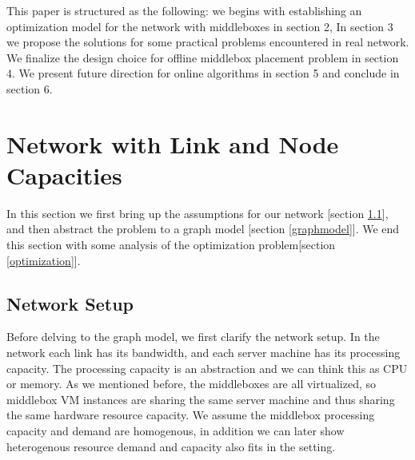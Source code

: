 \documentclass[twocolumn]{article}
\begin{document}
This paper is structured as the  following: we begins with establishing an optimization model for the network with middleboxes in section 2, In section 3 we propose the solutions for some practical problems encountered in real network. We finalize the design choice for offline middlebox placement problem in section 4. We present future direction for online algorithms in section 5 and conclude in section 6.
 

\section{Network with Link and Node Capacities}
In this section we first bring up the assumptions for our network [section \ref{setup}], and then abstract the problem to a graph model [section \ref{graphmodel}]. We end this section with some analysis of the optimization problem[section \ref{optimization}]. 

\subsection{Network Setup}\label{setup}
Before delving to the graph model, we first clarify the network setup. In the network each link has its bandwidth, and each server machine has its processing capacity. The processing capacity is an abstraction and we can think this as CPU or memory. As we mentioned before, the middleboxes are all virtualized, so middlebox VM instances are sharing the same server machine and thus sharing the same hardware resource capacity. We assume the middlebox processing capacity and demand are homogenous, in addition we can later show heterogenous resource demand and capacity also fits in the setting. 
\end{document}
